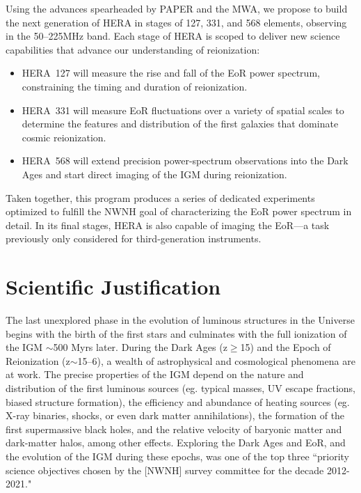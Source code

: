 \documentclass[preprint]{aastex}
\begin{document}
Using the advances spearheaded by
PAPER and the MWA,
we propose to build the next generation of HERA in stages of 127, 331, and 568 elements,
observing in the 50--225MHz band.
Each stage of HERA is scoped to deliver new science capabilities that advance our
understanding of reionization:
\vspace{-4pt}
\begin{itemize}\setlength{\parskip}{0pt}\itemsep0pt
\item HERA~127 will measure the rise and fall of the EoR power
spectrum, constraining the timing and duration of reionization.
\item HERA~331 will measure EoR fluctuations over a variety of
spatial scales to determine the features and distribution of
the first galaxies that dominate cosmic reionization.
\item HERA~568 will extend precision power-spectrum observations
into the Dark Ages and start direct imaging of the IGM during reionization.
\end{itemize}
\vspace{-4pt}
{ \setlength{\parindent}{0cm}
Taken together, this program produces a series of dedicated experiments
optimized to fulfill the NWNH goal of characterizing the EoR power spectrum
in detail. In its final stages, HERA
is also
capable of imaging the EoR---a task previously only considered for
third-generation instruments.}


\vspace{-0.25in}
\section{Scientific Justification}
\label{SJsec}

The last unexplored phase in the evolution of luminous structures in the
Universe begins with the birth of the first stars and culminates with the full
ionization of the IGM $\sim$500 Myrs later.  During the Dark Ages
(z$\ge$15) and the Epoch of Reionization (z$\sim$15--6), a wealth of
astrophysical and cosmological phenomena are at work.  The precise properties
of the IGM depend on the nature and distribution of the first luminous sources
(eg. typical masses, UV escape fractions, biased structure formation), the
efficiency and abundance of heating sources (eg.  X-ray binaries, shocks, or
even dark matter annihilations), the formation of the first supermassive black
holes, and the relative velocity of baryonic matter and dark-matter halos,
among other effects.  Exploring the Dark Ages and EoR, and the evolution of
the IGM during these epochs, was one of the top three
``priority science objectives chosen by the [NWNH] survey committee for the
decade 2012-2021."
\end{document}
